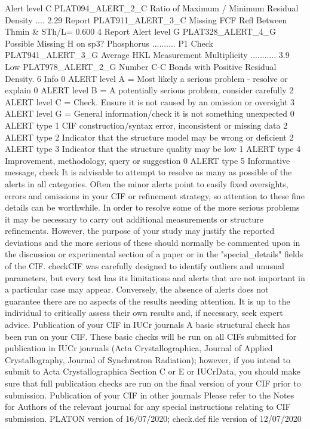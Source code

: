  Alert level C
PLAT094_ALERT_2_C Ratio of Maximum / Minimum Residual Density ....       2.29 Report
PLAT911_ALERT_3_C Missing FCF Refl Between Thmin & STh/L=    0.600          4 Report
 Alert level G
PLAT328_ALERT_4_G Possible Missing H on sp3? Phosphorus ..........         P1 Check 
PLAT941_ALERT_3_G Average HKL Measurement Multiplicity ...........        3.9 Low   
PLAT978_ALERT_2_G Number C-C Bonds with Positive Residual Density.          6 Info  
   0 ALERT level A = Most likely a serious problem - resolve or explain
   0 ALERT level B = A potentially serious problem, consider carefully
   2 ALERT level C = Check. Ensure it is not caused by an omission or oversight
   3 ALERT level G = General information/check it is not something unexpected
   0 ALERT type 1 CIF construction/syntax error, inconsistent or missing data
   2 ALERT type 2 Indicator that the structure model may be wrong or deficient
   2 ALERT type 3 Indicator that the structure quality may be low
   1 ALERT type 4 Improvement, methodology, query or suggestion
   0 ALERT type 5 Informative message, check
It is advisable to attempt to resolve as many as possible of the alerts in all categories. Often the
minor alerts point to easily fixed oversights, errors and omissions in your CIF or refinement
strategy, so attention to these fine details can be worthwhile. In order to resolve some of the more
serious problems it may be necessary to carry out additional measurements or structure
refinements. However, the purpose of your study may justify the reported deviations and the more
serious of these should normally be commented upon in the discussion or experimental section of a
paper or in the "special_details" fields of the CIF. checkCIF was carefully designed to identify
outliers and unusual parameters, but every test has its limitations and alerts that are not important
in a particular case may appear. Conversely, the absence of alerts does not guarantee there are no
aspects of the results needing attention. It is up to the individual to critically assess their own
results and, if necessary, seek expert advice.
Publication of your CIF in IUCr journals 
A basic structural check has been run on your CIF. These basic checks will be run on all CIFs
submitted for publication in IUCr journals (Acta Crystallographica, Journal of Applied 
Crystallography, Journal of Synchrotron Radiation); however, if you intend to submit to Acta
Crystallographica Section C or E or IUCrData, you should make sure that full publication checks
are run on the final version of your CIF prior to submission.
Publication of your CIF in other journals 
Please refer to the Notes for Authors of the relevant journal for any special instructions relating to
CIF submission.
PLATON version of 16/07/2020; check.def file version of 12/07/2020 


